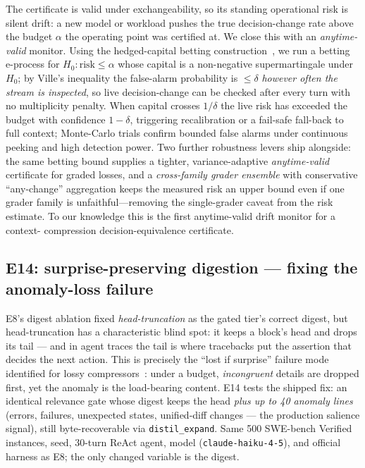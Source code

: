 \documentclass[11pt]{article}
\begin{document}
The certificate is valid under exchangeability, so its standing operational risk is silent
drift: a new model or workload pushes the true decision-change rate above the budget $\alpha$
the operating point was certified at. We close this with an \emph{anytime-valid} monitor. Using
the hedged-capital betting construction~\cite{wsr}, we run a betting
e-process for $H_0\!:\text{risk}\le\alpha$ whose capital is a non-negative supermartingale under
$H_0$; by Ville's inequality the false-alarm probability is $\le\delta$ \emph{however often the
stream is inspected}, so live decision-change can be checked after every turn with no
multiplicity penalty. When capital crosses $1/\delta$ the live risk has exceeded the budget with
confidence $1-\delta$, triggering recalibration or a fail-safe fall-back to full context;
Monte-Carlo trials confirm bounded false alarms under continuous peeking and high detection
power. Two further robustness levers ship alongside: the same betting bound supplies a tighter,
variance-adaptive \emph{anytime-valid} certificate for graded losses, and a \emph{cross-family
grader ensemble} with conservative ``any-change'' aggregation keeps the measured risk an
upper bound even if one grader family is unfaithful---removing the single-grader caveat from the
risk estimate. To our knowledge this is the first anytime-valid drift monitor for a context-
compression decision-equivalence certificate.

\subsection{E14: surprise-preserving digestion --- fixing the anomaly-loss failure}
\label{sec:e14}

E8's digest ablation fixed \emph{head-truncation} as the gated tier's correct digest, but
head-truncation has a characteristic blind spot: it keeps a block's head and drops its tail
--- and in agent traces the tail is where tracebacks put the assertion that decides the next
action. This is precisely the ``lost if surprise'' failure mode identified for lossy
compressors~\cite{silverbullet}: under a budget, \emph{incongruent} details are dropped
first, yet the anomaly is the load-bearing content. E14 tests the shipped fix: an identical
relevance gate whose digest keeps the head \emph{plus up to 40 anomaly lines} (errors,
failures, unexpected states, unified-diff changes --- the production salience signal), still
byte-recoverable via \texttt{distil\_expand}. Same 500 SWE-bench Verified instances, seed,
30-turn ReAct agent, model (\texttt{claude-haiku-4-5}), and official harness as E8; the only
changed variable is the digest.
\end{document}
